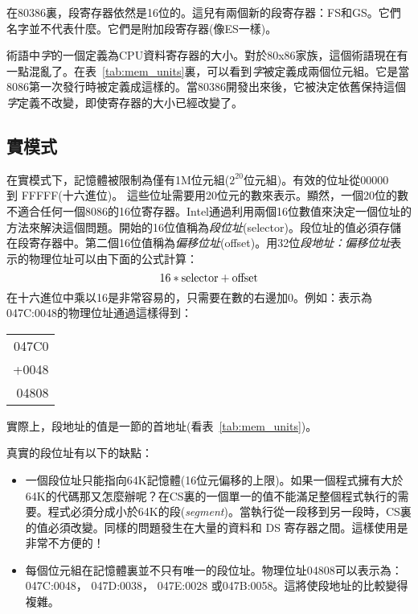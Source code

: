 在80386裏，段寄存器依然是16位的。這兒有兩個新的段寄存器：FS和GS。它們名字並不代表什麼。它們是附加段寄存器(像ES一樣)。

術語中\emph{字}的一個定義為CPU資料寄存器的大小。對於80x86家族，這個術語現在有一點混亂了。在表~\ref{tab:mem_units}裏，可以看到\emph{字}被定義成兩個位元組。它是當8086第一次發行時被定義成這樣的。當80386開發出來後，它被決定依舊保持這個\emph{字}定義不改變，即使寄存器的大小已經改變了。

\subsection{實模式 \label{real_mode} }

在實模式下，記憶體被限制為僅有1M位元組($2^{20}$位元組)。有效的位址從00000 \\到 FFFFF(十六進位)。  %
這些位址需要用20位元的數來表示。顯然，一個20位的數不適合任何一個8086的16位寄存器。Intel通過利用兩個16位數值來決定一個位址的方法來解決這個問題。開始的16位值稱為\emph{段位址}(selector)。段位址的值必須存儲在段寄存器中。第二個16位值稱為\emph{偏移位址}(offset)。用32位\emph{段地址：偏移位址}表示的物理位址可以由下面的公式計算：
\[ 16 * {\rm selector} + {\rm offset} \]
在十六進位中乘以16是非常容易的，只需要在數的右邊加0。例如：表示為047C:0048的物理位址通過這樣得到：
\begin{center}
\begin{tabular}{r}
047C0 \\
+0048 \\
\hline
04808 \\
\end{tabular}
\end{center}
實際上，段地址的值是一節的首地址(看表~\ref{tab:mem_units})。

真實的段位址有以下的缺點：
\begin{itemize}
\item 一個段位址只能指向64K記憶體(16位元偏移的上限)。如果一個程式擁有大於64K的代碼那又怎麼辦呢？在CS裏的一個單一的值不能滿足整個程式執行的需要。程式必須分成小於64K的段(\emph{segment})。當執行從一段移到另一段時，CS裏的值必須改變。同樣的問題發生在大量的資料和
DS 寄存器之間。這樣使用是非常不方便的！

\item 每個位元組在記憶體裏並不只有唯一的段位址。物理位址04808可以表示為：047C:0048， 047D:0038， 047E:0028
或047B:0058。\@ 這將使段地址的比較變得複雜。

\end{itemize}

